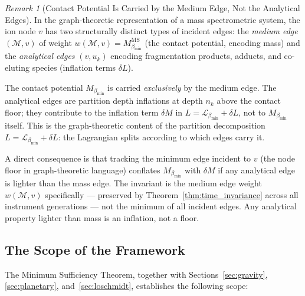 \documentclass[11pt,twocolumn,a4paper]{article}
\theoremstyle{plain}
\theoremstyle{definition}
\theoremstyle{remark}
\newtheorem{remark}[theorem]{Remark}
\newcommand{\bmin}{\beta_{\min}}
\newcommand{\Lmin}{\mathcal{L}_{\bmin}}
\begin{document}
\begin{remark}[Contact Potential Is Carried by the Medium Edge, Not the Analytical Edges]
\label{rem:medium_edge}
In the graph-theoretic representation of a mass spectrometric system, the
ion node $v$ has two structurally distinct types of incident edges:
the \emph{medium edge} $(\mathcal{M}, v)$ of weight $w(\mathcal{M}, v) = M_{\bmin}^{\mathrm{MS}}$
(the contact potential, encoding mass) and the \emph{analytical edges}
$(v, u_k)$ encoding fragmentation products, adducts, and co-eluting species
(inflation terms $\delta L$).

The contact potential $M_{\bmin}$ is carried \emph{exclusively} by the medium
edge. The analytical edges are partition depth inflations at depth $n_k$
above the contact floor; they contribute to the inflation term $\delta M$ in
$L = \Lmin + \delta L$, not to $M_{\bmin}$ itself. This is the graph-theoretic
content of the partition decomposition $L = \Lmin + \delta L$: the Lagrangian
splits according to which edges carry it.

A direct consequence is that tracking the minimum edge incident to $v$
(the node floor in graph-theoretic language) conflates $M_{\bmin}$ with
$\delta M$ if any analytical edge is lighter than the mass edge. The invariant
is the medium edge weight $w(\mathcal{M}, v)$ specifically --- preserved by
Theorem~\ref{thm:time_invariance} across all instrument generations --- not
the minimum of all incident edges. Any analytical property lighter than mass
is an inflation, not a floor.
\end{remark}

\subsection{The Scope of the Framework}

The Minimum Sufficiency Theorem, together with Sections~\ref{sec:gravity},
\ref{sec:planetary}, and~\ref{sec:loschmidt}, establishes the following scope:
\end{document}
